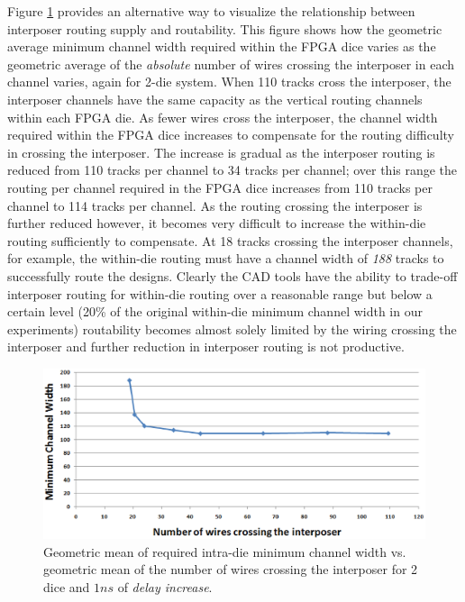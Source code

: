 \documentclass[journal]{IEEEtran}
\begin{document}
Figure \ref{fig:crossingwires} provides an alternative way to visualize the relationship between interposer routing supply and routability. This figure shows how the geometric average minimum channel width required within the FPGA dice varies as the geometric average of the \emph{absolute} number of wires crossing the interposer in each channel varies, again for 2-die system. When 110 tracks cross the interposer, the interposer channels have the same capacity as the vertical routing channels within each FPGA die. As fewer wires cross the interposer, the channel width required within the FPGA dice increases to compensate for the routing difficulty in crossing the interposer. The increase is gradual as the interposer routing is reduced from 110 tracks per channel to 34 tracks per channel; over this range the routing per channel required in the FPGA dice increases from 110 tracks per channel to 114 tracks per channel. As the routing crossing the interposer is further reduced however, it becomes very difficult to increase the within-die routing sufficiently to compensate. At 18 tracks crossing the interposer channels, for example, the within-die routing must have a channel width of \emph{188} tracks to successfully route the designs. Clearly the CAD tools have the ability to trade-off interposer routing for within-die routing over a reasonable range but below a certain level (20\% of the original within-die minimum channel width in our experiments) routability becomes almost solely limited by the wiring crossing the interposer and further reduction in interposer routing is not productive.

\begin{figure}[!t]
\centering
\includegraphics[width=\linewidth]{numberofcrossingwires_new_2.eps}
\caption{Geometric mean of required intra-die minimum channel width vs. geometric mean of the number of wires crossing the interposer for 2 dice and $1ns$ of \textit{delay increase}.}
\label{fig:crossingwires}
\end{figure}
\end{document}
